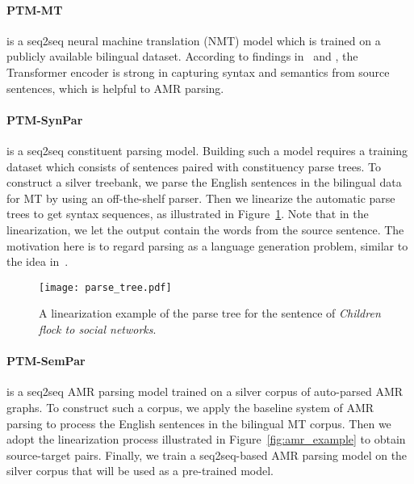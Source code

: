 \documentclass[11pt,a4paper]{article}
\newcommand{\ignore}[1]{}
\begin{document}
\paragraph{PTM-MT} is a seq2seq neural machine translation (NMT) model which is trained on a publicly available bilingual dataset. According to findings in~\citet{goldberg_arxiv_2019} and \citet{jawahar_etal_acl_2019}, the Transformer encoder is strong in capturing syntax and semantics from source sentences, which is helpful to AMR parsing.

\paragraph{PTM-SynPar} is a seq2seq constituent parsing model. Building such a model requires a training dataset which consists of sentences paired with constituency parse trees. To construct a silver treebank, we parse the English sentences in the bilingual data for MT by using an off-the-shelf parser\ignore{ to obtain a silver treebank}. Then we linearize the automatic parse trees to get syntax sequences, as illustrated in Figure~\ref{fig:syn_example}. Note that in the linearization, we let the output contain the words from the source sentence. The motivation here is to regard parsing as a language generation problem, similar to the idea in~\citet{choe_charniak_emnlp_2016}. 

\begin{figure}[t]
\begin{center}
\texttt{[image: parse\_tree.pdf]}
\end{center}
\caption{A linearization example of the parse tree for the sentence of \textit{Children flock to social networks}.} \label{fig:syn_example}
\end{figure}

\paragraph{PTM-SemPar} is a seq2seq AMR parsing model trained on a silver corpus of auto-parsed AMR graphs. To construct such a corpus, we apply the baseline system of AMR parsing to process the English sentences in the bilingual MT corpus. Then we adopt the linearization process illustrated in Figure~\ref{fig:amr_example} to obtain source-target pairs. Finally, we train a seq2seq-based AMR parsing model on the silver corpus that will be used as a pre-trained model.
\end{document}
